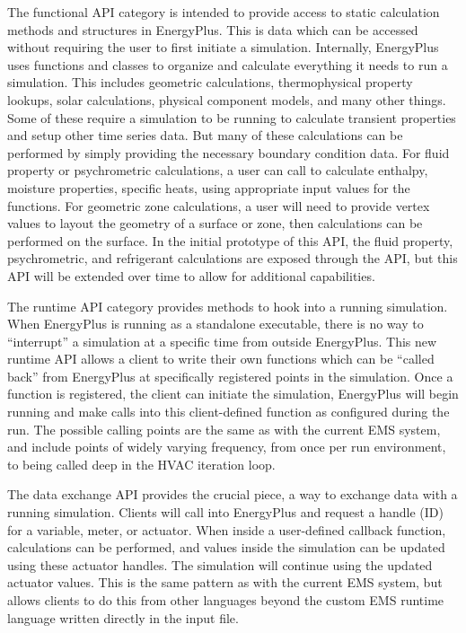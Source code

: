 \documentclass[5p]{elsarticle}
\begin{document}
The functional API category is intended to provide access to static calculation methods and structures in EnergyPlus.  This is data which can be accessed without requiring the user to first initiate a simulation.  Internally, EnergyPlus uses functions and classes to organize and calculate everything it needs to run a simulation.  This includes geometric calculations, thermophysical property lookups, solar calculations, physical component models, and many other things.  Some of these require a simulation to be running to calculate transient properties and setup other time series data.  But many of these calculations can be performed by simply providing the necessary boundary condition data.  For fluid property or psychrometric calculations, a user can call to calculate enthalpy, moisture properties, specific heats, using appropriate input values for the functions.  For geometric zone calculations, a user will need to provide vertex values to layout the geometry of a surface or zone, then calculations can be performed on the surface.  In the initial prototype of this API, the fluid property, psychrometric, and refrigerant calculations are exposed through the API, but this API will be extended over time to allow for additional capabilities.

The runtime API category provides methods to hook into a running simulation.  When EnergyPlus is running as a standalone executable, there is no way to “interrupt” a simulation at a specific time from outside EnergyPlus.  This new runtime API allows a client to write their own functions which can be “called back” from EnergyPlus at specifically registered points in the simulation.  Once a function is registered, the client can initiate the simulation, EnergyPlus will begin running and make calls into this client-defined function as configured during the run.  The possible calling points are the same as with the current EMS system, and include points of widely varying frequency, from once per run environment, to being called deep in the HVAC iteration loop.

The data exchange API provides the crucial piece, a way to exchange data with a running simulation.  Clients will call into EnergyPlus and request a handle (ID) for a variable, meter, or actuator.  When inside a user-defined callback function, calculations can be performed, and values inside the simulation can be updated using these actuator handles.  The simulation will continue using the updated actuator values.  This is the same pattern as with the current EMS system, but allows clients to do this from other languages beyond the custom EMS runtime language written directly in the input file.
\end{document}
